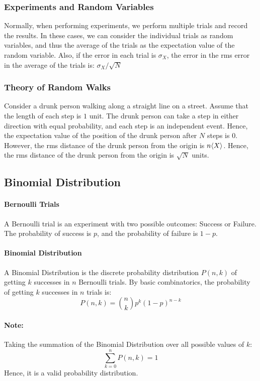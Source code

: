 \documentclass[12pt, oneside]{book}
\DeclarePairedDelimiter{\evdel}{\langle}{\rangle}
\newcommand{\ev}{\evdel}
\begin{document}
\subsubsection{Experiments and Random Variables}
Normally, when performing experiments, we perform multiple trials and record the results.
In these cases, we can consider the individual trials as random variables, and thus the average of the trials as the expectation value of the random variable.
Also, if the error in each trial is \(\sigma_X\), the error in the rms error in the average of the trials is: \(\sigma_X/\sqrt{N}\)

\subsubsection{Theory of Random Walks}
Consider a drunk person walking along a straight line on a street.
Assume that the length of each step is \(1\) unit.
The drunk person can take a step in either direction with equal probability, and each step is an independent event.
Hence, the expectation value of the position of the drunk person after \(N\) steps is \(0\).
However, the rms distance of the drunk person from the origin is \(n \ev{X}\).
Hence, the rms distance of the drunk person from the origin is \(\sqrt{N}\) units.

\subsection{Binomial Distribution}
\paragraph{Bernoulli Trials} A Bernoulli trial is an experiment with two possible outcomes: Success or Failure.
The probability of success is \(p\), and the probability of failure is \(1-p\).

\paragraph{Binomial Distribution} A Binomial Distribution is the discrete probability distribution \(P\left(n,k\right)\) of getting \(k\) successes in \(n\) Bernoulli trials.
By basic combinatorics, the probability of getting \(k\) successes in \(n\) trials is:
\[ P\left(n,k\right) = \binom{n}{k} p^k \left(1-p\right)^{n-k} \]

\paragraph{Note:} Taking the summation of the Binomial Distribution over all possible values of \(k\):
\[ \sum_{k=0}^{n} P\left(n,k\right) = 1 \]
Hence, it is a valid probability distribution.
\end{document}
